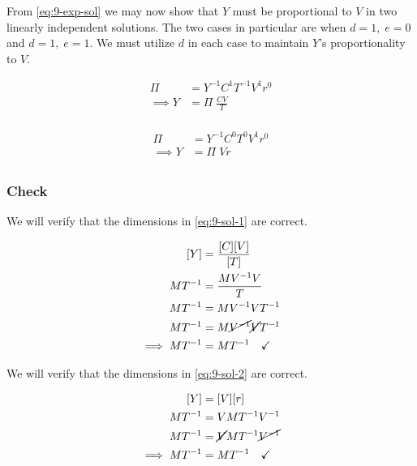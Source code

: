 \documentclass[12pt]{article}
\begin{document}
  From \cref{eq:9-exp-sol} we may now show that $Y$ must be proportional to $V$
  in two linearly independent solutions. The two cases in particular are when
  $d=1,\; e=0$ and $d=1,\; e=1$. We must utilize $d$ in each case to maintain $Y$'s
  proportionality to $V$.

  \begin{multicols}{2}
    \begin{equation}
      \label{eq:9-sol-1}
      \boxed{
      \begin{aligned}
        \Pi &= Y^{-1} C^{1} T^{-1} V^1 r^0 \\
        \implies Y &= \Pi\;\frac{CV}{T} \\
      \end{aligned}
      }
    \end{equation}

    \begin{equation}
      \label{eq:9-sol-2}
      \boxed{
      \begin{aligned}
        \Pi &= Y^{-1} C^{0} T^{0} V^1 r^0 \\
        \implies Y &= \Pi\; Vr \\
      \end{aligned}
      }
    \end{equation}
  \end{multicols}

  \subsubsection*{Check}
  We will verify that the dimensions in \cref{eq:9-sol-1} are correct.

  \begin{equation}
    \begin{aligned}
      [Y] &= \frac{[C][V]}{[T]} \\
      MT^{-1} &= \frac{MV^{-1}V}{T} \\
      MT^{-1} &= MV^{-1}VT^{-1} \\
      MT^{-1} &= M\cancel{V^{-1}}\cancel{V}T^{-1} \\
      \implies MT^{-1} &= MT^{-1} \quad\checkmark \\
    \end{aligned}
  \end{equation}

  We will verify that the dimensions in \cref{eq:9-sol-2} are correct.

  \begin{equation}
    \begin{aligned}
      [Y] &= [V] [r] \\
      MT^{-1} &= V MT^{-1}V^{-1} \\
      MT^{-1} &= \cancel{V} MT^{-1} \cancel{V^{-1}} \\
      \implies MT^{-1} &= MT^{-1} \quad\checkmark \\
    \end{aligned}
  \end{equation}
\end{document}
